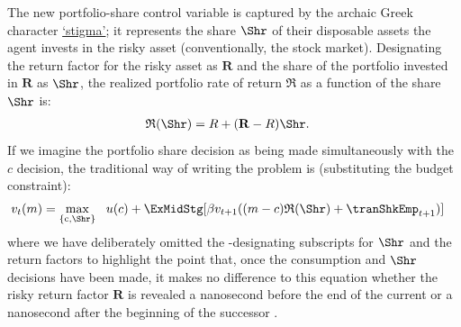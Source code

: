 \documentclass[titlepage, headings=optiontotocandhead]{econtex}
\begin{document}
The new portfolio-share control variable is captured by the archaic Greek character \href{https://en.wikipedia.org/wiki/Stigma_(ligature)}{`stigma'}; it represents the share $\Shr$ of their disposable assets the agent invests in the risky asset (conventionally, the stock market).  Designating the return factor for the risky asset as ${\mathbf{R}}$ and the share of the portfolio invested in ${\mathbf{R}}$ as $\Shr$, the realized portfolio rate of return $\mathfrak{R}$ as a function of the share $\Shr$ is:
\begin{equation}\begin{gathered}\begin{aligned}
      \mathfrak{R}(\Shr) &= R+({\mathbf{R}}-R)\Shr \label{eq:Shr}.
    \end{aligned}\end{gathered}\end{equation}
If we imagine the portfolio share decision as being made simultaneously with the $c$ decision, the traditional way of writing the problem is (substituting the budget constraint):
\begin{equation}\begin{gathered}\begin{aligned}
      v_{t}(m)  & = \max_{\{\mathrm{c},\Shr\}} ~~  u(c) + \ExMidStg[\beta v_{t+1}((m-c)\mathfrak{R}(\Shr) + {\tranShkEmp}_{t+1})] \label{eq:Bellmanundated}
    \end{aligned}\end{gathered}\end{equation}
where we have deliberately omitted the {\interval}-designating subscripts for $\Shr$ and the return factors to highlight the point that, once the consumption and $\Shr$ decisions have been made, it makes no difference to this equation whether the risky return factor ${\mathbf{R}}$ is revealed a nanosecond before the end of the current {\interval} or a nanosecond after the beginning of the successor {\interval}.
\end{document}

